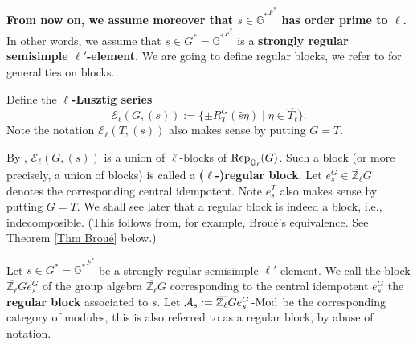 		\textbf{From now on, we assume moreover that $s \in {\mathbb{G}^*}^{F^*}$ has order prime to $\ell$.} In other words, we assume that $s \in G^*={\mathbb{G}^*}^{F^*}$ is a \textbf{strongly regular semisimple $\ell'$-element}. We are going to define regular blocks, we refer to \cite[Appendix B]{bonnafe2010representations} for generalities on blocks.
		
		Define the \textbf{$\ell$-Lusztig series} 
		$$\mathcal{E}_\ell(G, (s)):=\{\pm R_T^G(\hat{s}\eta)\;|\; \eta \in \widehat{T_\ell}\}.$$ Note the notation $\mathcal{E}_\ell(T, (s))$ also makes sense by putting $G=T$.
		
		By \cite{michel1989bloc}, $\mathcal{E}_\ell(G, (s))$ is a union of $\ell$-blocks of $\operatorname{\operatorname{Rep}}_{\overline{\mathbb{Q}_\ell}}(G)$. Such a block (or more precisely, a union of blocks) is called a \textbf{($\ell$-)regular block}. Let $e_s^G \in \overline{\mathbb{Z}_\ell}G$ denotes the corresponding central idempotent. Note $e_s^T$ also makes sense by putting $G=T$. We shall see later that a regular block is indeed a block, i.e., indecomposible. (This follows from, for example, Broué's equivalence. See Theorem \ref{Thm Broué} below.)
		
		\begin{definition}\label{Def Regular Block}
			Let $s \in G^*={\mathbb{G}^*}^{F^*}$ be a strongly regular semisimple $\ell'$-element.
			We call the block $\overline{\mathbb{Z}_\ell}Ge_s^G$ of the group algebra $\overline{\mathbb{Z}_\ell}G$ corresponding to the central idempotent $e_s^G$ the \textbf{regular block} associated to $s$. Let $\mathcal{A}_s:=\overline{\mathbb{Z}_\ell}Ge_s^G\operatorname{-Mod}$ be the corresponding category of modules, this is also referred to as a regular block, by abuse of notation.
			
			
		\end{definition}
		
		
		
		
